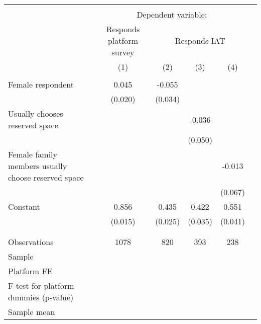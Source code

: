 \begin{tabular}{l*{5}{c}} \hline\hline \\[-1.8ex] & \multicolumn{4}{c}{Dependent variable:} \\ & \multicolumn{1}{c}{Responds platform survey} & \multicolumn{3}{c}{Responds IAT} \\ \cmidrule(lr){2-2}\cmidrule(lr){3-5}
                    &\multicolumn{1}{c}{(1)}         &\multicolumn{1}{c}{(2)}         &\multicolumn{1}{c}{(3)}         &\multicolumn{1}{c}{(4)}         \\
\hline \\[-1.8ex]
Female respondent   &       0.045\sym{**} &      -0.055         &                     &                     \\
                    &     (0.020)         &     (0.034)         &                     &                     \\
[1em]
Usually chooses reserved space&                     &                     &      -0.036         &                     \\
                    &                     &                     &     (0.050)         &                     \\
[1em]
Female family members usually choose reserved space&                     &                     &                     &      -0.013         \\
                    &                     &                     &                     &     (0.067)         \\
[1em]
Constant            &       0.856\sym{***}&       0.435\sym{***}&       0.422\sym{***}&       0.551\sym{***}\\
                    &     (0.015)         &     (0.025)         &     (0.035)         &     (0.041)         \\
\\[-1.8ex] \hline \\[-1.8ex]
Observations        &        1078         &         820         &         393         &         238         \\
Sample              &                     &                     &                     &                     \\
Platform FE         &                     &                     &                     &                     \\
F-test for platform dummies (p-value)&                     &                     &                     &                     \\
Sample mean         &                     &                     &                     &                     \\
\hline\hline \end{tabular}
